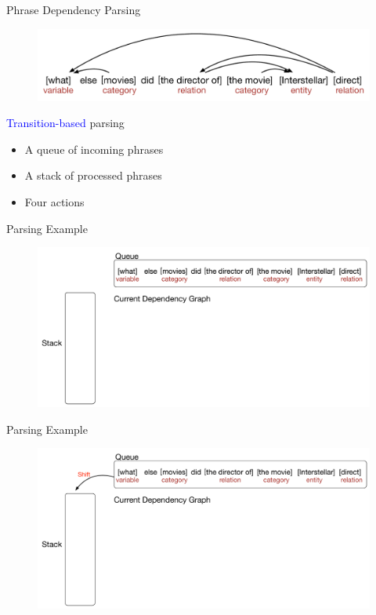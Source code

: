\documentclass{beamer}
\begin{document}
\begin{frame}{Phrase Dependency Parsing}
	\begin{figure}
		\centering\includegraphics[width=1.0\textwidth]{introduction/DAG.pdf}
	\end{figure}
	\textcolor{blue}{Transition-based} parsing
	\begin{itemize}
		\item A queue of incoming phrases
		\item A stack of processed phrases
		\item Four actions
	\end{itemize}
\end{frame}

\begin{frame}{Parsing Example}
	\begin{figure}
		\centering\includegraphics[width=1.0\textwidth]{introduction/parsing_examples/0.pdf}
	\end{figure}	
\end{frame}

\begin{frame}{Parsing Example}
	\begin{figure}
		\centering\includegraphics[width=1.0\textwidth]{introduction/parsing_examples/1.pdf}
	\end{figure}	
\end{frame}
\end{document}
